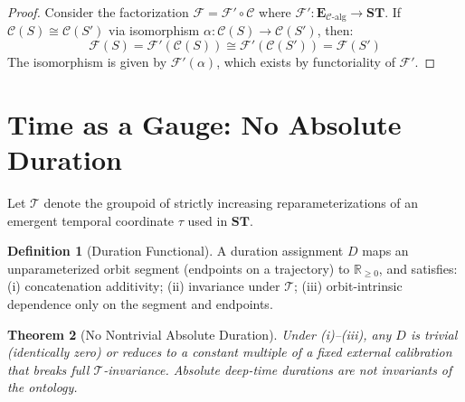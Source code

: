 \documentclass[11pt]{article}
\theoremstyle{definition}
\newtheorem{definition}{Definition}[section]
\theoremstyle{plain}
\newtheorem{theorem}[definition]{Theorem}
\theoremstyle{remark}
\newcommand{\Ecat}{\mathbf{E}}      %
\newcommand{\ST}{\mathbf{ST}}       %
\newcommand{\F}{\mathcal{F}}        %
\newcommand{\C}{\mathcal{C}}        %
\begin{document}
\begin{proof}
Consider the factorization $\F = \F' \circ \C$ where $\F': \Ecat_{\C\text{-alg}} \to \ST$. If $\C(S) \cong \C(S')$ via isomorphism $\alpha: \C(S) \to \C(S')$, then:
$$\F(S) = \F'(\C(S)) \cong \F'(\C(S')) = \F(S')$$
The isomorphism is given by $\F'(\alpha)$, which exists by functoriality of $\F'$.
\end{proof}

\section{Time as a Gauge: No Absolute Duration}
Let $\mathcal{T}$ denote the groupoid of strictly increasing reparameterizations of an emergent temporal coordinate $\tau$ used in $\ST$.

\begin{definition}[Duration Functional]
A duration assignment $D$ maps an unparameterized orbit segment (endpoints on a trajectory) to $\mathbb{R}_{\ge 0}$, and satisfies: (i) concatenation additivity; (ii) invariance under $\mathcal{T}$; (iii) orbit-intrinsic dependence only on the segment and endpoints.
\end{definition}

\begin{theorem}[No Nontrivial Absolute Duration]\label{thm:no_duration}
Under (i)–(iii), any $D$ is trivial (identically zero) or reduces to a constant multiple of a fixed external calibration that breaks full $\mathcal{T}$-invariance. Absolute deep-time durations are not invariants of the ontology.
\end{theorem}
\end{document}
